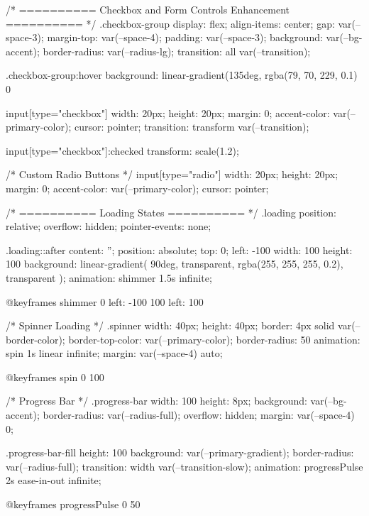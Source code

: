 {{/* ========== Checkbox and Form Controls Enhancement ========== */
.checkbox-group {
  display: flex;
  align-items: center;
  gap: var(--space-3);
  margin-top: var(--space-4);
  padding: var(--space-3);
  background: var(--bg-accent);
  border-radius: var(--radius-lg);
  transition: all var(--transition);
}

.checkbox-group:hover {
  background: linear-gradient(135deg, rgba(79, 70, 229, 0.1) 0%
}

input[type="checkbox"] {
  width: 20px;
  height: 20px;
  margin: 0;
  accent-color: var(--primary-color);
  cursor: pointer;
  transition: transform var(--transition);
}

input[type="checkbox"]:checked {
  transform: scale(1.2);
}

/* Custom Radio Buttons */
input[type="radio"] {
  width: 20px;
  height: 20px;
  margin: 0;
  accent-color: var(--primary-color);
  cursor: pointer;
}

/* ========== Loading States ========== */
.loading {
  position: relative;
  overflow: hidden;
  pointer-events: none;
}

.loading::after {
  content: '';
  position: absolute;
  top: 0;
  left: -100%
  width: 100%
  height: 100%
  background: linear-gradient(
    90deg,
    transparent,
    rgba(255, 255, 255, 0.2),
    transparent
  );
  animation: shimmer 1.5s infinite;
}

@keyframes shimmer {
  0%
    left: -100%
  }
  100%
    left: 100%
  }
}

/* Spinner Loading */
.spinner {
  width: 40px;
  height: 40px;
  border: 4px solid var(--border-color);
  border-top-color: var(--primary-color);
  border-radius: 50%
  animation: spin 1s linear infinite;
  margin: var(--space-4) auto;
}

@keyframes spin {
  0%
  100%
}

/* Progress Bar */
.progress-bar {
  width: 100%
  height: 8px;
  background: var(--bg-accent);
  border-radius: var(--radius-full);
  overflow: hidden;
  margin: var(--space-4) 0;
}

.progress-bar-fill {
  height: 100%
  background: var(--primary-gradient);
  border-radius: var(--radius-full);
  transition: width var(--transition-slow);
  animation: progressPulse 2s ease-in-out infinite;
}

@keyframes progressPulse {
  0%
  50%
}

